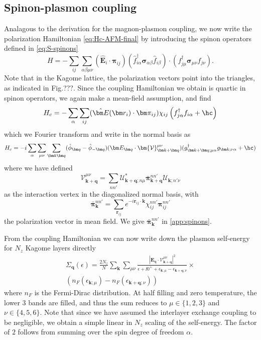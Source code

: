 \subsection{Spinon-plasmon coupling}
Analagous to the derivation for the magnon-plasmon coupling, we now write the polarization Hamiltonian \cref{eq:Hc-AFM-final} by introducing the spinon operators defined in \cref{eq:S-spinons}
\begin{equation}
	H = -\sum_{ij}\sum_{\alpha\beta\mu\nu} (\hat{\bm E}_i\cdot\bm\pi_{ij}) (\hat f_{i\alpha}^\dagger \bm\sigma_{\alpha\beta} \hat f_{i\beta}) \cdot(f_{j\mu}^\dagger\bm \sigma_{\mu\nu}f_{j\nu}).
\end{equation}
Note that in the Kagome lattice, the polarization vectors point into the triangles, as indicated in Fig.???.
Since the coupling Hamiltonian we obtain is quartic in spinon operators, we again make a mean-field assumption, and find 
\begin{equation}
	H_c = -\sum_{\alpha}\sum_{ij} (\hat{\bm E}(\bm r_i)\cdot \bm \pi_{ij}) \chi_{ij} \left(f_{j\alpha}^\dagger f_{i\alpha} + \hc \right)
\end{equation}
which we Fourier transform and write in the normal basis as
\begin{equation}
	H_c = -i\sum_\alpha\sum_{\mu\nu}\sum_{\bm k\bm q} (\hat\phi_{\bm q}-\hat\phi_{-\bm q}) ( \bm E_{\bm q}\cdot\bm{\mathcal V}_{\bm k + \bm q}^{\mu\nu})( g_{\bm k+\bm q;\mu\alpha}^\dagger g_{\bm k;\nu\alpha} + \hc)
\end{equation}
where we have defined
\begin{equation}
	{\bm{\mathcal V}}_{\bm k + \bm q}^{\mu\nu} = \sum_{nn'}\mathcal U_{\bm k + \bm q;n\mu}^*\bar{\bm\pi}_{\bm k+\bm q}^{nn'} \mathcal U_{\bm k;n'\nu}
\end{equation}
as the interaction vertex in the diagonalized normal basis, with
\begin{equation}
	\bar{\bm\pi}_{\bm k}^{nn'} = \sum_{\bm r_{ij}}e^{-i\bm r_{ij}\cdot\bm k} \chi_{ij}^{nn'}\bm\pi_{ij}^{nn'}
\end{equation}
the polarization vector in mean field. We give $\bar{\bm\pi}_{\bm k}^{nn'}$ in \cref{app:spinons}.

From the coupling Hamiltonian we can now write down the plasmon self-energy for $N_z$ Kagome layers directly
\begin{multline}
	\Sigma_{\bm q}(\epsilon) = \frac{2N_z}{N}\sum_{\bm k} \sum_{\mu\nu} \frac{|\bm E_{\bm q}\cdot {\bm{\mathcal V}}_{\bm k + \bm q}^{\mu\nu}|^2}{\epsilon + \ii 0^+ + \epsilon_{\bm k;\mu} - \epsilon_{\bm k+\bm q;\nu}}\times \\ 
	\left(n_F(\epsilon_{\bm k;\mu}) - n_F(\epsilon_{\bm k+\bm q;\nu})\right)
\end{multline}
where $n_F$ is the Fermi-Dirac distribution. At half filling and zero temperature, the lower 3 bands are filled, and thus the sum reduces to $\mu\in\{1,2,3\}$ and $\nu\in\{4,5,6\}$. Note that since we have assumed the interlayer exchange coupling to be negligible, we obtain a simple linear in $N_z$ scaling of the self-energy. The factor of $2$ follows from summing over the spin degree of freedom $\alpha$.

